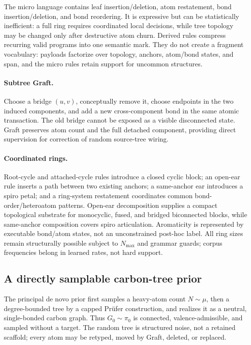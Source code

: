 \documentclass{article}
\newcommand{\pzero}{\pi_0}
\theoremstyle{definition}
\theoremstyle{remark}
\begin{document}
The micro language contains leaf insertion/deletion, atom restatement, bond insertion/deletion, and bond reordering. It is expressive but can be statistically inefficient: a full ring requires coordinated local decisions, while tree topology may be changed only after destructive atom churn. Derived rules compress recurring valid programs into one semantic mark. They do not create a fragment vocabulary: payloads factorize over topology, anchors, atom/bond states, and span, and the micro rules retain support for uncommon structures.

\paragraph{Subtree Graft.}
Choose a bridge $(u,v)$, conceptually remove it, choose endpoints in the two induced components, and add a new cross-component bond in the same atomic transaction. The old bridge cannot be exposed as a visible disconnected state. Graft preserves atom count and the full detached component, providing direct supervision for correction of random source-tree wiring.

\paragraph{Coordinated rings.}
Root-cycle and attached-cycle rules introduce a closed cyclic block; an open-ear rule inserts a path between two existing anchors; a same-anchor ear introduces a spiro petal; and a ring-system restatement coordinates common bond-order/heteroatom patterns. Open-ear decomposition supplies a compact topological substrate for monocyclic, fused, and bridged biconnected blocks, while same-anchor composition covers spiro articulation. Aromaticity is represented by executable bond/atom states, not an unconstrained post-hoc label. All ring sizes remain structurally possible subject to $N_{\max}$ and grammar guards; corpus frequencies belong in learned rates, not hard support.

\subsection{A directly samplable carbon-tree prior}

The principal de novo prior first samples a heavy-atom count $N\sim\mu$, then a degree-bounded tree by a capped Pr\"ufer construction, and realizes it as a neutral, single-bonded carbon graph. Thus $G_0\sim\pzero$ is connected, valence-admissible, and sampled without a target. The random tree is structured noise, not a retained scaffold; every atom may be retyped, moved by Graft, deleted, or replaced.
\end{document}
